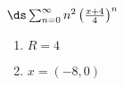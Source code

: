 {$\ds\sum_{n=0}^\infty n^2\left(\frac{x+4}{4}\right)^n$
}
{\begin{enumerate}
	\item $R=4$
	\item	$x=(-8,0)$
\end{enumerate}
}